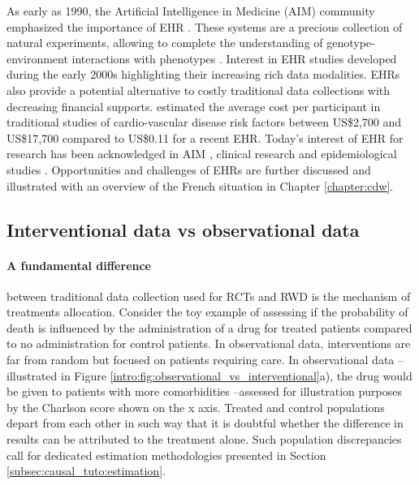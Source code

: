 \documentclass[french,12pt,twoside,a4paper]{book}
\begin{document}
\begin{background_box_left}
  As early as 1990, the Artificial Intelligence in Medicine (AIM) community
  emphasized the importance of EHR \citep{shortliffe1993adolescence}. These
  systems are a precious collection of natural experiments, allowing to complete
  the understanding of genotype-environment interactions with phenotypes
  \citep{butte2006creation,patel2009coming}. Interest in EHR studies developed
  during the early 2000s highlighting their increasing rich data modalities.
  EHRs also provide a potential alternative to costly traditional data collections
  with decreasing financial supports. \cite{casey2016using} estimated the
  average cost per participant in traditional studies of cardio-vascular disease
  risk factors between US\$2,700 and US\$17,700 compared to US\$0.11 for a recent EHR.
  Today's interest of EHR for research has been acknowledged in AIM
  \citep{yu2018artificial}, clinical research \citep{cowie2017electronic} and
  epidemiological studies \citep{casey2016using,gianfrancesco2021narrative}.
  Opportunities and challenges of EHRs are further discussed and illustrated
  with an overview of the French situation in Chapter \ref{chapter:cdw}.


  \subsection{Interventional data vs observational data}%
  \label{subsec:intro:interventional_vs_observational}%

  \paragraph{A fundamental difference} between traditional data collection used
  for RCTs and RWD is the mechanism of treatments allocation. Consider the toy
  example of assessing if the probability of death is influenced by
  \textcolor{I}{the administration of a drug for treated patients} compared to
  \textcolor{C}{no administration for control patients}. In observational data,
  interventions are far from random but focused on patients requiring care. In
  observational data --illustrated in Figure
  \ref{intro:fig:observational_vs_interventional}a), the drug would be given to
  patients with more comorbidities --assessed for illustration purposes by the
  Charlson score \citep{charlson_new_1987} shown on the x axis. Treated and
  control populations depart from each other in such way that it is doubtful
  whether the difference in results can be attributed to the treatment alone.
  Such population discrepancies call for dedicated estimation methodologies
  presented in Section \ref{subsec:causal_tuto:estimation}.

\end{background_box_left}
\end{document}
